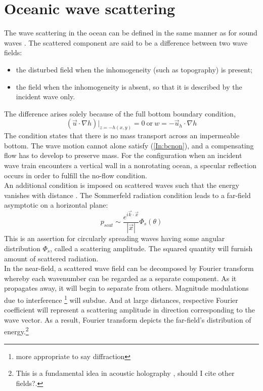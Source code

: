 \documentclass[12pt]{article}
\begin{document}
\section{Oceanic wave scattering}
The wave scattering in the ocean can be defined in the same manner as for sound waves 
\citep{Lighthill2001}. The scattered component are said to be a difference between two wave fields:
\begin{itemize}
	\item the disturbed field when the inhomogeneity (such as topography) is present;
	\item the field when the inhomogeneity is absent, so that it is described by the incident wave 
	only.
\end{itemize}
The difference arises solely because of the full bottom boundary condition,
\begin{equation}
( \vec{u} \cdot \nabla h )|_{z = -h(x, y)} = 0~\text{or}~w = - \vec{u}_h \cdot \nabla h 
\label{In:bcnon} 
\end{equation}
The condition states that there is no mass transport across an impermeable bottom. The wave motion 
cannot alone satisfy (\ref{In:bcnon}), and a compensating flow has to develop to preserve mass. For 
the configuration when an incident wave train encounters a vertical wall in a nonrotating ocean, a 
specular reflection occurs in order to fulfill the no-flow condition.\\
An additional condition is imposed on scattered waves such that the energy vanishes with distance 
\citep{mei1989theory, morse1946methods, olbers1981formal}. The Sommerfeld radiation condition leads 
to a far-field asymptotic on a horizontal plane:
\begin{equation}
\label{In:def.scamp}
p_{scat} \sim \frac{e^{i \vec{k} \cdot \vec{x}}}{|\vec{x}|} \Phi_s (\theta)
\end{equation}
This is an assertion for circularly spreading waves having some angular distribution $\Phi_s$, 
called a scattering amplitude. The squared quantity will furnish amount of scattered radiation.\\
In the near-field, a scattered wave field can be decomposed by Fourier transform whereby each 
wavenumber can be regarded as a separate component. As it propagates away, it will begin to 
separate from others. Magnitude modulations due to interference \footnote{more appropriate to say 
diffraction} will subdue. And at large distances, respective Fourier coefficient will represent a 
scattering amplitude in direction corresponding to the wave vector. As a result, Fourier transform 
depicts the far-field's distribution of energy.\footnote{ This is a fundamental idea in acoustic 
holography \citep{williams1999fourier}, should I cite other fields?.}
\end{document}
